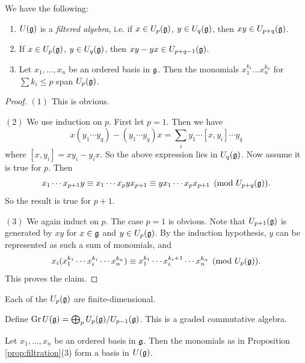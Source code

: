 \begin{prop}\label{prop:filtration}
  We have the following:
  \begin{enumerate}
    \item $U(\mathfrak{g})$ is a \emph{filtered algebra}, i.e.
      if $x \in U_p(\mathfrak{g})$, $y \in U_q(\mathfrak{g})$,
      then $xy \in U_{p + q}(\mathfrak{g})$.
    \item If $x \in U_p(\mathfrak{g})$, $y \in U_q(\mathfrak{g})$,
      then $xy - yx \in U_{p + q - 1}(\mathfrak{g})$.
    \item Let $x_1, \dots, x_n$ be an ordered basis
      in $\mathfrak{g}$. Then the monomials
      $x_1^{k_1} \dots x_n^{k_n}$
      for $\sum k_i \le p$ span $U_p(\mathfrak{g})$.
  \end{enumerate}
\end{prop}

\begin{proof}
  $(1)$ This is obvious.

  $(2)$ We use induction on $p$.
  First let $p = 1$. Then we have
  \[
    x(y_1 \cdots y_q) - (y_1 \cdots y_q)x
    = \sum_i y_1 \cdots [x, y_i] \cdots y_q
  \]
  where $[x, y_i] = xy_i - y_i x$.
  So the above expression lies in
  $U_q(\mathfrak{g})$. Now assume it is true for $p$.
  Then
  \[
    x_1 \cdots x_{p + 1} y
    \equiv x_1 \cdots x_p y x_{p + 1}
    \equiv y x_1 \cdots x_p x_{p + 1}
    \pmod{U_{p + q}(\mathfrak{g})}.
  \]
  So the result is true for $p + 1$.
  
  $(3)$ We again induct on $p$. The case
  $p = 1$ is obvious. Note that
  $U_{p + 1}(\mathfrak{g})$ is generated by
  $xy$ for $x \in \mathfrak{g}$ and $y \in U_p(\mathfrak{g})$.
  By the induction hypothesis, $y$ can
  be represented as such a sum of monomials, and
  \[
    x_i (x_1^{k_1} \cdots x_i^{k_i} \cdots x_n^{k_n})
    \equiv x_1^{k_1} \cdots x_i^{k_i + 1} \cdots x_n^{k_n}
    \pmod{U_p(\mathfrak{g})}.
  \]
  This proves the claim.
\end{proof}

\begin{corollary}
  Each of the $U_p(\mathfrak{g})$ are finite-dimensional.
\end{corollary}

\begin{corollary}
  Define $\operatorname{Gr} U(\mathfrak{g}) = \bigoplus_p U_p(\mathfrak{g}) / U_{p - 1}(\mathfrak{g})$.
  This is a graded commutative algebra.
\end{corollary}

\begin{theorem}
  Let $x_1, \dots, x_n$ be an ordered basis
  in $\mathfrak{g}$. Then the monomials
  as in Proposition \ref{prop:filtration}(3)
  form a basis in $U(\mathfrak{g})$.
\end{theorem}


